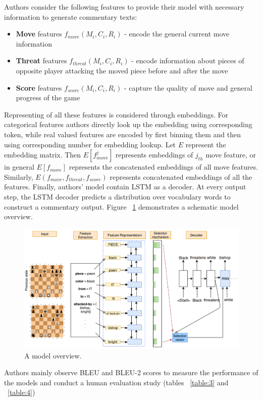 \documentclass{article}
\begin{document}
Authors consider the following features to provide their model with necessary information to generate commentary texts:

\begin{itemize}
\item \textbf{Move} features $f_{move}(M_i, C_i, R_i)$ - encode the general current move information
\item \textbf{Threat} features $f_{threat}(M_i, C_i, R_i)$ - encode information about pieces of opposite player attacking the moved piece before and after the move
\item \textbf{Score} features $f_{score}(M_i, C_i, R_i)$ - capture the quality of move and general progress of the game
\end{itemize}

Representing of all these features is considered through embeddings. For categorical features authors directly look up the embedding using corresponding token, while real valued features are encoded by first binning them and then using corresponding number for embedding lookup. Let $E$ represent the embedding matrix. Then $E[f^j_{move}]$ represents embeddings of $j_{th}$ move feature, or in general $E[f_{move}]$ represents the concatenated embeddings of all move features. Similarly, $E(f_{move}, f_{threat}, f_{score})$ represents concatenated embeddings of all the features.
Finally, authors' model contain LSTM as a decoder. At every output step, the LSTM decoder predicts a distribution over vocabulary words to construct a commentary output. Figure ~\ref{fig:1} demonstrates a schematic model overview.

\begin{figure}
    \centering
    \includegraphics[width = 12cm]{fig_1.png}
    \caption{A model overview.}
    \label{fig:1}
    \end{figure}

Authors mainly observe BLEU and BLEU-2 scores to measure the performance of the models and conduct a human evaluation study (tables ~\ref{table:3} and ~\ref{table:4})
\end{document}
